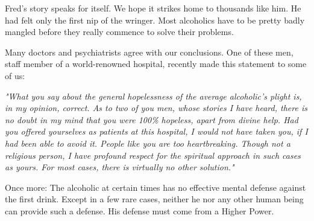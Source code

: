 \begin{biblechapter}
\verse Fred's story speaks for itself. 
\verse We hope it strikes home to thousands like him. 
\verse He had felt only the first nip of the wringer. 
\verse Most alcoholics have to be pretty badly mangled 
    before they really commence to solve their problems.
\end{biblechapter}


\begin{biblechapter}
    Many doctors and psychiatrists agree with our conclusions. 
\verse One of these men, 
    staff member of a world-renowned hospital, 
    recently made this statement to some of us: 

\emph{
\verse "What you say about the general hopelessness 
    of the average alcoholic's plight is, in my opinion, correct.  
\verse As to two of you men, whose stories I have heard, 
    there is no doubt in my mind that you were 100\% hopeless, 
    apart from divine help.  
\verse Had you offered yourselves as patients at this hospital, 
    I would not have taken you, 
    if I had been able to avoid it. 
\verse People like you are too heartbreaking. 
\verse Though not a religious person, 
    I have profound respect for the spiritual approach 
    in such cases as yours. 
\verse For most cases, there is virtually no other solution."
}

\verse Once more: 
    The alcoholic at certain times has no effective mental defense 
    against the first drink. 
\verse Except in a few rare cases, 
    neither he nor any other human being can provide such a defense. 
\verse His defense must come from a Higher Power.
\end{biblechapter}

